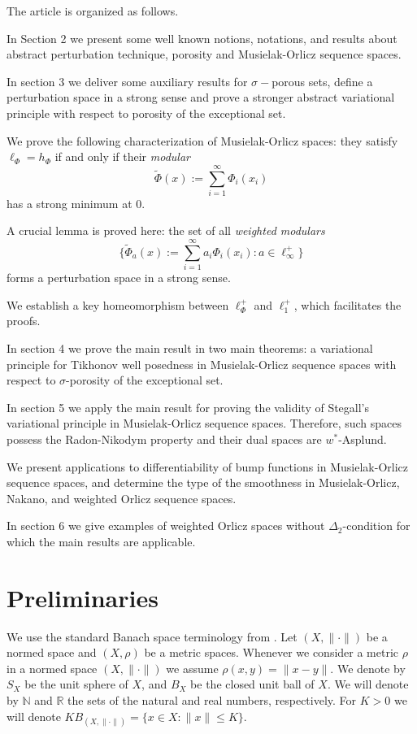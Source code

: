 \documentclass[12pt]{article}
\theoremstyle{thmstyleone}%
\theoremstyle{thmstyletwo}%
\theoremstyle{thmstylethree}%
\begin{document}
{The article is organized as follows. 

In Section 2 we present some well known notions, notations, and results about
abstract perturbation technique, porosity and Musielak-Orlicz sequence spaces.

In section 3 we deliver some auxiliary results for $\sigma-$porous sets, define a perturbation space in a strong sense and prove a stronger abstract variational principle with respect to porosity of the exceptional set. 

We prove the following characterization of Musielak-Orlicz spaces: they satisfy $\ell_\Phi=h_\Phi$ if and only if their {\it modular} 
$$
\tilde{\Phi}(x):=\sum_{i=1}^\infty \Phi_i(x_i)
$$
 has a strong minimum at $0$.

A crucial lemma is proved here: the set of all {\it weighted modulars}
$$
\Big\{\widetilde \Phi_a(x):=\sum_{i=1}^\infty a_i \Phi_i(x_i): a\in \ell_\infty^+ \Big\}
$$
 forms a perturbation space in a strong sense.
 
 We establish a key homeomorphism between $\ell_\Phi^+$ and $\ell_1^+$, which facilitates the proofs.

In section 4 we prove the main result in two main theorems: a variational principle for Tikhonov well posedness in Musielak-Orlicz sequence spaces with respect to $\sigma$-porosity of the exceptional set. 


In section 5 we apply the main result for proving the validity of Stegall's variational principle in Musielak-Orlicz sequence spaces. Therefore, such spaces possess the Radon-Nikodym property and their dual spaces are $w^*$-Asplund.

We present applications to differentiability of bump functions in Musielak-Orlicz sequence spaces, and
determine the type of the smoothness in Musielak-Orlicz, Nakano, and weighted Orlicz sequence spaces.
}

In section 6 we give examples of weighted Orlicz spaces without $\Delta_2$-condition for which the main results are applicable.


\section{Preliminaries}

We use the standard Banach space terminology from \cite{Lindenstrauss-Tzafriri}. Let
$(X,\|\cdot\|)$ be a normed space and $(X,\rho)$ be a metric spaces. Whenever we consider a metric $\rho$ in a normed space $(X,\|\cdot\|)$ we assume $\rho(x,y)=\|x-y\|$. We denote by $S_X$ be the unit sphere of $X$, and $B_X$ be the closed unit ball of $X$. 
We will denote by $\mathbb{N}$ and $\mathbb{R}$ the sets of the natural and real numbers, respectively.
For $K>0$ we will denote $KB_{(X,\|\cdot\|)}=\{x\in X:\|x\|\leq K\}$.
\end{document}

